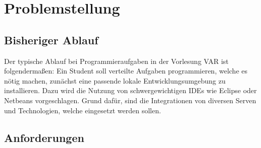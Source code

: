 \chapter{Problemstellung}
\blindtext
\section{Bisheriger Ablauf}
Der typische Ablauf bei Programmieraufgaben in der Vorlesung \ac{VAR} ist folgendermaßen:
Ein Student soll verteilte Aufgaben programmieren, welche es nötig machen, zunächst eine passende lokale Entwicklungsumgebung zu installieren.
Dazu wird die Nutzung von schwergewichtigen \acp{IDE} wie Eclipse oder Netbeans vorgeschlagen. Grund dafür, sind die Integrationen von diversen Serven und Technologien, welche eingesetzt werden sollen.
\section{Anforderungen}
